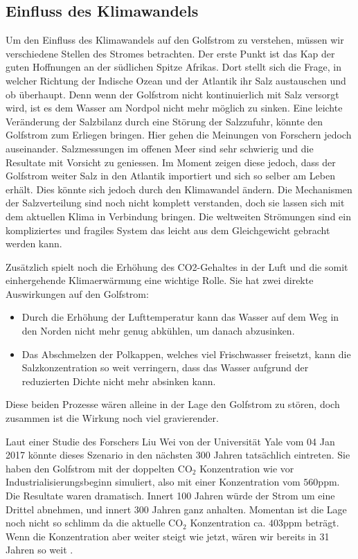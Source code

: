 \subsection{Einfluss des Klimawandels}\label{thermohalin:EinflussKlimawandel}
Um den Einfluss des Klimawandels auf den Golfstrom zu verstehen, müssen wir verschiedene Stellen des Stromes betrachten.
Der erste Punkt ist das Kap der guten Hoffnungen an der südlichen Spitze Afrikas.
Dort stellt sich die Frage, in welcher Richtung der Indische Ozean und der Atlantik ihr Salz austauschen und ob überhaupt. Denn wenn der Golfstrom nicht kontinuierlich mit Salz versorgt wird, ist es dem Wasser am Nordpol nicht mehr möglich zu sinken. Eine leichte Veränderung der Salzbilanz durch eine Störung der Salzzufuhr,  könnte den Golfstrom zum Erliegen bringen. Hier gehen die Meinungen von Forschern jedoch auseinander. Salzmessungen im offenen Meer sind sehr schwierig und die Resultate mit Vorsicht zu geniessen.
Im Moment zeigen diese jedoch, dass der Golfstrom weiter Salz in den Atlantik importiert und sich so selber am Leben erhält. Dies könnte sich jedoch durch den Klimawandel ändern. Die Mechanismen der Salzverteilung sind noch nicht komplett verstanden, doch sie lassen sich mit dem aktuellen Klima in Verbindung bringen. Die weltweiten Strömungen sind ein kompliziertes und fragiles System das leicht aus dem Gleichgewicht gebracht werden kann. 

Zusätzlich spielt noch die Erhöhung des CO2-Gehaltes in der Luft und die somit einhergehende Klimaerwärmung eine wichtige Rolle. Sie hat zwei direkte Auswirkungen auf den Golfstrom:

\begin{itemize}
	\item Durch die Erhöhung der Lufttemperatur kann das Wasser auf dem Weg in den Norden nicht mehr genug abkühlen, um danach abzusinken.
	\item Das Abschmelzen der Polkappen, welches viel Frischwasser freisetzt, kann die Salzkonzentration so weit verringern, dass das Wasser aufgrund der reduzierten Dichte nicht mehr absinken kann.
\end{itemize}

Diese beiden Prozesse wären alleine in der Lage den Golfstrom zu stören, doch zusammen ist die Wirkung noch viel gravierender.

Laut einer Studie des Forschers Liu Wei von der Universität Yale vom 04 Jan 2017 \cite{thermohalin:liuwei} könnte dieses Szenario in den nächsten 300 Jahren tatsächlich eintreten. Sie haben den Golfstrom mit der doppelten $\text{CO}_2$ Konzentration wie vor Industrialisierungsbeginn simuliert, also mit einer Konzentration vom $560\text{ppm}$. Die Resultate waren dramatisch. Innert 100 Jahren würde der Strom um eine Drittel abnehmen, und innert 300 Jahren ganz anhalten. Momentan ist die Lage noch nicht so schlimm da die aktuelle $\text{CO}_2$ Konzentration ca. $403\text{ppm}$\cite{thermohalin:co2} beträgt. Wenn die Konzentration aber weiter steigt wie jetzt, wären wir bereits in 31 Jahren so weit .

